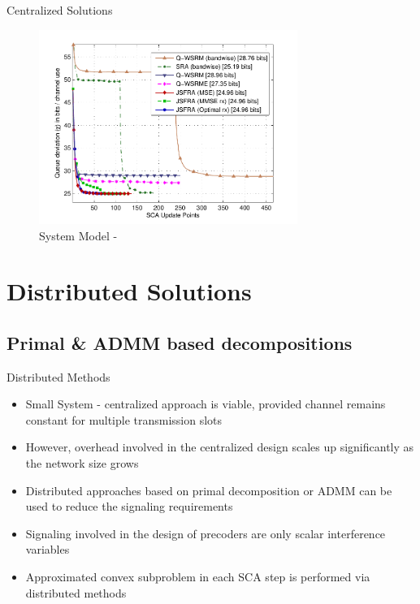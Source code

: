 \documentclass[9pt]{beamer}
\begin{document}
\begin{frame}{Centralized Solutions}
	\begin{figure}
		\centering
		\includegraphics[width=0.75\textwidth]{fig-2-5}
		\caption{System Model - }
	\end{figure}
\end{frame}

\section{Distributed Solutions}

\subsection{Primal \& \acs{ADMM} based decompositions}

\begin{frame}{Distributed Methods}
	\begin{itemize}
		\item \alert{Small System - centralized approach is viable}, provided channel remains constant for multiple transmission slots
		\item However, overhead involved in the centralized design scales up significantly as the network size grows
		\item Distributed approaches based on primal decomposition or \acs{ADMM} can be used to reduce the signaling requirements
		\item Signaling involved in the design of precoders are only \alert{scalar interference variables}
		\item Approximated convex subproblem in each \acs{SCA} step is performed via distributed methods
	\end{itemize}
\end{frame}
\end{document}
